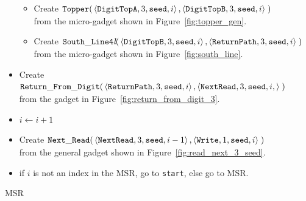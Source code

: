 \begin{itemize}
\begin{itemize}
        \item Create
        $\begin{aligned}[t]
            {\tt Topper}(&\left\langle {\tt DigitTopA}, 3, {\tt seed}, i \right\rangle,
                          \left\langle {\tt DigitTopB}, 3, {\tt seed}, i \right\rangle \;)
        \end{aligned}$\\from the micro-gadget shown in Figure~\ref{fig:topper_gen}.

        \item Create
        $\begin{aligned}[t]
            {\tt South\_Line4\textit{l}}(&\left\langle {\tt DigitTopB},  3, {\tt seed}, i \right\rangle,
                                          \left\langle {\tt ReturnPath}, 3, {\tt seed}, i \right\rangle \;)
        \end{aligned}$\\from the micro-gadget shown in Figure~\ref{fig:south_line}.
    \end{itemize}

    \item Create
    $\begin{aligned}[t]
        {\tt Return\_From\_Digit}(&\left\langle {\tt ReturnPath}, 3, {\tt seed}, i  \right\rangle,
                          \left\langle {\tt NextRead},   3, {\tt seed}, i, \right\rangle \;)
    \end{aligned}$\\from the gadget in Figure~\ref{fig:return_from_digit_3}.

    \item $i \gets i + 1$

    \item Create
    $\begin{aligned}[t]
        {\tt Next\_Read}(&\left\langle {\tt NextRead},  3, {\tt seed}, i - 1 \right\rangle,
                   \left\langle {\tt Write},     1, {\tt seed}, i     \right\rangle \;)
    \end{aligned}$\\ from the general gadget shown in Figure~\ref{fig:read_next_3_seed}.

    \item if $i$ is not an index in the MSR, go to {\tt start}, else go to MSR.
\end{itemize}

\vspace{1cm}




\Huge{MSR}\normalsize



